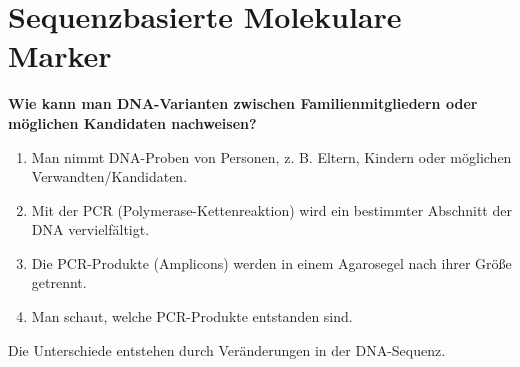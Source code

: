 



\section{Sequenzbasierte Molekulare Marker}\label{sec:sequenzbasierte-molekulare-marker}
\begin{fr}
    \textbf{Wie kann man DNA-Varianten zwischen Familienmitgliedern oder möglichen Kandidaten nachweisen?}
    \begin{enumerate}
        \item Man nimmt DNA-Proben von Personen, z.
        B. Eltern, Kindern oder möglichen Verwandten/Kandidaten.
        \item Mit der PCR (Polymerase-Kettenreaktion) wird ein bestimmter Abschnitt der DNA vervielfältigt.
        \item Die PCR-Produkte (Amplicons) werden in einem Agarosegel nach ihrer Größe getrennt.
        \item Man schaut, welche PCR-Produkte entstanden sind.
    \end{enumerate}
    Die Unterschiede entstehen durch Veränderungen in der DNA-Sequenz. \cite{vorlesung10}
\end{fr}

